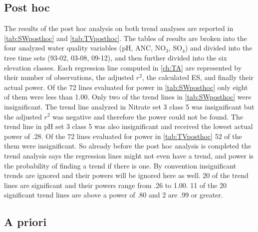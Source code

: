 \subsection{Post hoc}
The results of the post hoc analysis on both trend analyses are reported in  \autoref{tab:SWposthoc} and \autoref{tab:TVposthoc}.
The tables of results are broken into the four analyzed water quality variables (pH, ANC, NO$_3$, SO$_4$) and divided into the tree time sets (93-02, 03-08, 09-12), and then further divided into the six elevation classes.
Each regression line computed in \autoref{ch:TA} are represented by their number of observations, the adjusted $r^2$, the calculated ES, and finally their actual power.
Of the 72 lines evaluated for power in \autoref{tab:SWposthoc} only eight of them were less than 1.00.
Only two of the trend lines in \autoref{tab:SWposthoc} were insignificant.
The trend line analyzed in Nitrate set 3 class 5 was insignificant but the adjusted $r^2$ was negative and therefore the power could not be found.
The trend line in pH set 3 class 5 was also insignificant and received the lowest actual power of .28.
Of the 72 lines evaluated for power in \autoref{tab:TVposthoc} 52 of the them were insignificant.
So already before the post hoc analysis is completed the trend analysis says the regression lines might not even have a trend, and power is the probability of finding a trend if there is one.
By convention insignificant trends are ignored and their powers will be ignored here as well.
20 of the trend lines are significant and their powers range from .26 to 1.00.
11 of the 20 significant trend lines are above a power of .80 and 2 are .99 or greater.

\subsection{A priori}
